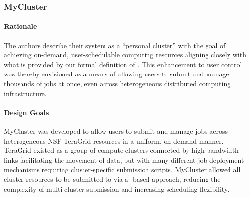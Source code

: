 \documentclass{sig-alternate}
\begin{document}



\subsubsection{MyCluster}
\paragraph{Rationale}
The authors describe their system
as a ``personal cluster'' with the goal of achieving on-demand,
user-schedulable computing resources aligning closely with what is
provided by our formal definition of \pilotjobs.  This enhancement
to user control was thereby envisioned as a means of allowing
users to submit and manage thousands of jobs at once, even
across heterogeneous distributed computing infrastructure.


\paragraph{Design Goals}
MyCluster was developed to allow users to submit and manage
jobs across heterogeneous NSF TeraGrid resources in a uniform,
on-demand manner.  TeraGrid existed as a group of compute clusters
connected by high-bandwidth links facilitating the movement
of data, but with many different job deployment mechanisms
requiring cluster-specific submission scripts.  MyCluster
allowed all cluster resources to be submitted to via a
\pilotjob-based approach, reducing the complexity of
multi-cluster submission and increasing scheduling flexibility.
\end{document}
